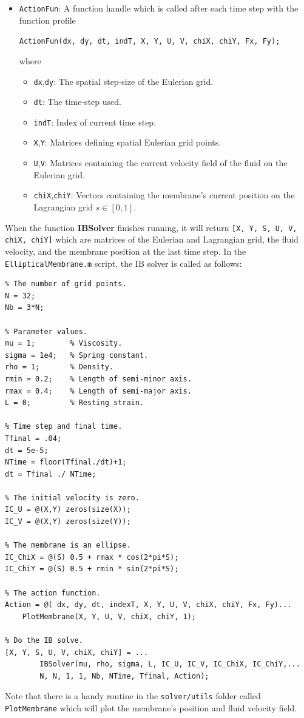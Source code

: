 \documentclass{article}
\newcommand{\mycode}[1]{\texttt{#1}}
\begin{document}
\begin{itemize}
\item \mycode{ActionFun}: A function handle which is called after each time step with the function profile
							\begin{center}\mycode{ActionFun(dx, dy, dt, indT, X, Y, U, V, chiX, chiY, Fx, Fy);}\end{center}
							where 
							\begin{itemize}
								\item \mycode{dx},\;\mycode{dy}: The spatial step-size of the Eulerian grid.
								\item \mycode{dt}: The time-step used.
								\item \mycode{indT}: Index of current time step.
								\item \mycode{X},\;\mycode{Y}: Matrices defining spatial Eulerian grid points.
								\item \mycode{U},\;\mycode{V}: Matrices containing the current velocity field of the fluid on the Eulerian grid. 
								\item \mycode{chiX},\;\mycode{chiY}: Vectors containing the membrane's current position on the Lagrangian grid $s\in[0,1]$.
							\end{itemize}
\end{itemize}
When the function {\bf IBSolver} finishes running, it will return \mycode{[X, Y, S, U, V, chiX, chiY]} which are matrices of the Eulerian and Lagrangian grid,
the fluid velocity, and the membrane position at the last time step.
\newpage
In the \mycode{EllipticalMembrane.m} script, the IB solver is called as follows:
\begin{lstlisting}
% The number of grid points.
N = 32;
Nb = 3*N;

% Parameter values.
mu = 1;        % Viscosity.
sigma = 1e4;   % Spring constant.
rho = 1;       % Density.
rmin = 0.2;    % Length of semi-minor axis.
rmax = 0.4;    % Length of semi-major axis.
L = 0;         % Resting strain.

% Time step and final time.
Tfinal = .04;
dt = 5e-5;
NTime = floor(Tfinal./dt)+1;
dt = Tfinal ./ NTime;

% The initial velocity is zero.
IC_U = @(X,Y) zeros(size(X));
IC_V = @(X,Y) zeros(size(Y));

% The membrane is an ellipse.
IC_ChiX = @(S) 0.5 + rmax * cos(2*pi*S);
IC_ChiY = @(S) 0.5 + rmin * sin(2*pi*S);

% The action function.
Action = @( dx, dy, dt, indexT, X, Y, U, V, chiX, chiY, Fx, Fy)...
    PlotMembrane(X, Y, U, V, chiX, chiY, 1);

% Do the IB solve.
[X, Y, S, U, V, chiX, chiY] = ...
        IBSolver(mu, rho, sigma, L, IC_U, IC_V, IC_ChiX, IC_ChiY,...
        N, N, 1, 1, Nb, NTime, Tfinal, Action);
\end{lstlisting}
Note that there is a handy routine in the \mycode{solver/utils} folder called \mycode{PlotMembrane} 
which will plot the membrane's position and fluid velocity field.
\end{document}
